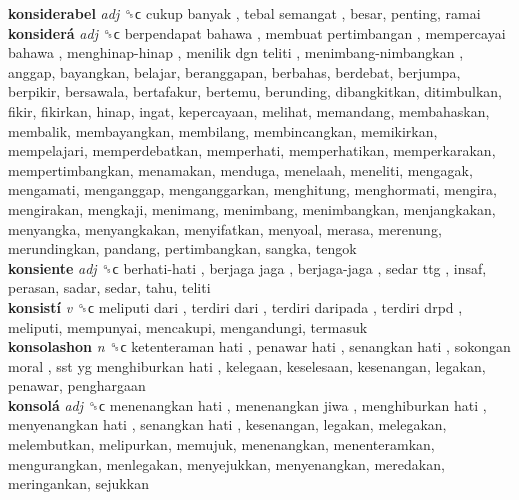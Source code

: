 \textbf{konsiderabel} \emph{adj}  ␝ϲ   cukup banyak ,  tebal semangat , besar, penting, ramai  \\
\textbf{konsiderá} \emph{adj}  ␝ϲ   berpendapat bahawa ,  membuat pertimbangan ,  mempercayai bahawa ,  menghinap-hinap ,  menilik dgn teliti ,  menimbang-nimbangkan , anggap, bayangkan, belajar, beranggapan, berbahas, berdebat, berjumpa, berpikir, bersawala, bertafakur, bertemu, berunding, dibangkitkan, ditimbulkan, fikir, fikirkan, hinap, ingat, kepercayaan, melihat, memandang, membahaskan, membalik, membayangkan, membilang, membincangkan, memikirkan, mempelajari, memperdebatkan, memperhati, memperhatikan, memperkarakan, mempertimbangkan, menamakan, menduga, menelaah, meneliti, mengagak, mengamati, menganggap, menganggarkan, menghitung, menghormati, mengira, mengirakan, mengkaji, menimang, menimbang, menimbangkan, menjangkakan, menyangka, menyangkakan, menyifatkan, menyoal, merasa, merenung, merundingkan, pandang, pertimbangkan, sangka, tengok  \\
\textbf{konsiente} \emph{adj}  ␝ϲ   berhati-hati ,  berjaga jaga ,  berjaga-jaga ,  sedar ttg , insaf, perasan, sadar, sedar, tahu, teliti  \\
\textbf{konsistí} \emph{v}  ␝ϲ   meliputi dari ,  terdiri dari ,  terdiri daripada ,  terdiri drpd , meliputi, mempunyai, mencakupi, mengandungi, termasuk  \\
\textbf{konsolashon} \emph{n}  ␝ϲ   ketenteraman hati ,  penawar hati ,  senangkan hati ,  sokongan moral ,  sst yg menghiburkan hati , kelegaan, keselesaan, kesenangan, legakan, penawar, penghargaan  \\
\textbf{konsolá} \emph{adj}  ␝ϲ   menenangkan hati ,  menenangkan jiwa ,  menghiburkan hati ,  menyenangkan hati ,  senangkan hati , kesenangan, legakan, melegakan, melembutkan, melipurkan, memujuk, menenangkan, menenteramkan, mengurangkan, menlegakan, menyejukkan, menyenangkan, meredakan, meringankan, sejukkan  \\
